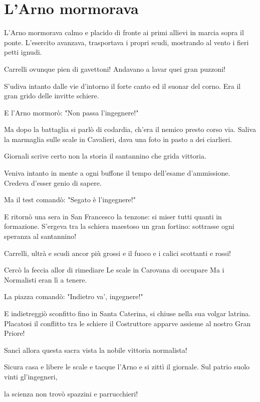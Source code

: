 \section{L'Arno mormorava}
{\fontsize{13}{16}\selectfont
\begin{canzone}
L'Arno mormorava
calmo e placido di fronte
ai primi allievi in marcia sopra il ponte.
L'esercito avanzava,
trasportava i propri scudi,
mostrando al vento i fieri petti ignudi.

Carrelli ovunque pien di gavettoni!
Andavano a lavar quei gran puzzoni!

S'udiva intanto dalle vie d'intorno
il forte canto ed il suonar del corno.
Era il gran grido delle invitte schiere.

E l'Arno mormorò:
"Non passa l'ingegnere!"

Ma dopo la battaglia
si parlò di codardia,
ch'era il nemico presto corso via.
Saliva la marmaglia
sulle scale in Cavalieri,
dava una foto in pasto a dei ciarlieri.

Giornali scrive certo non la storia
il santannino che grida vittoria.

Veniva intanto in mente a ogni buffone
il tempo dell'esame d'ammissione.
Credeva d'esser genio di sapere.

Ma il test comandò:
"Segato è l'ingegnere!"

E ritornò una sera
in San Francesco la tenzone:
si miser tutti quanti in formazione.
S'ergeva tra la schiera
maestoso un gran fortino:
sottrasse ogni speranza al santannino!

Carrelli, ultrà e scudi ancor più grossi
e il fuoco e i calici scottanti e rossi!

Cercò la feccia allor di rimediare
Le scale in Carovana di occupare
Ma i Normalisti eran lì a tenere.

La piazza comandò:
"Indietro va', ingegnere!"

E indietreggiò sconfitto
fino in Santa Caterina,
si chiuse nella sua volgar latrina.
Placatosi il conflitto
tra le schiere il Costruttore
apparve assieme al nostro Gran Priore!

Sancì allora questa sacra vista
la nobile vittoria normalista!

Sicura casa e libere le scale
e tacque l'Arno e si zittì il giornale.
Sul patrio suolo vinti gl'ingegneri,

la scienza non trovò
spazzini e parrucchieri!
\end{canzone}
}
